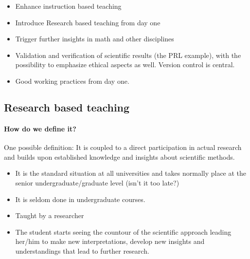 \documentclass[%
twoside,                 %
final,                   %
10pt]{article}
\begin{document}
\begin{itemize}
\item Enhance instruction based teaching

\item Introduce Research based teaching  from day one

\item Trigger further insights in math and other disciplines 

\item Validation and verification of scientific results (the PRL example), with the possibility to emphasize ethical aspects as well. Version control is central.

\item Good working practices from day one.
\end{itemize}

\noindent





\subsection*{Research based teaching}

\paragraph{How do we define it?}
One possible definition: It is coupled to a direct participation in actual research and builds upon established
knowledge and insights about scientific methods.


\begin{itemize}
\item It is the standard situation at all universities  and takes normally place at the senior undergraduate/graduate level (isn't it too late?)

\item It is seldom done in undergraduate courses.

\item Taught by a researcher

\item The student starts seeing the countour of the scientific approach leading her/him to make new interpretations, develop new insights and understandings that lead  to further research.
\end{itemize}

\noindent
\end{document}
